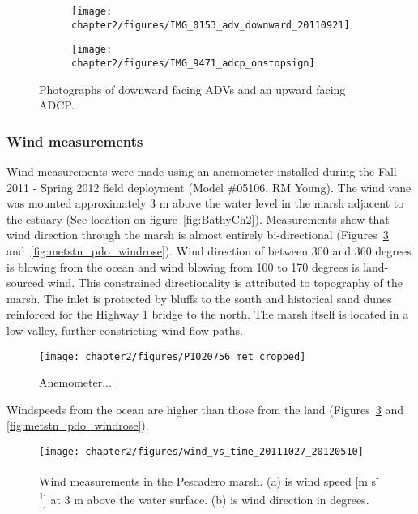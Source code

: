 \begin{figure}[t]
\begin{subfigure}{.5\textwidth}
	\texttt{[image: chapter2/figures/IMG\_0153\_adv\_downward\_20110921]}
\end{subfigure}
\begin{subfigure}{.5\textwidth}
	\texttt{[image: chapter2/figures/IMG\_9471\_adcp\_onstopsign]}
\end{subfigure}
\caption{Photographs of downward facing ADVs and an upward facing ADCP.} \label{fig:ADVADCPphoto}
\end{figure}


\subsubsection{Wind measurements} \label{sssec:windmeas}
Wind measurements were made using an anemometer installed during the Fall 2011 - Spring 2012 field deployment (Model \#05106, RM Young). The wind vane was mounted approximately 3 m above the water level in the marsh adjacent to the estuary (See location on figure~\ref{fig:BathyCh2}).  Measurements show that wind direction through the marsh is almost entirely bi-directional (Figures~\ref{fig:metstn_pdo_ws_wdir} and~\ref{fig:metstn_pdo_windrose}). Wind direction of between 300 and 360 degrees is blowing from the ocean and wind blowing from 100 to 170 degrees is land-sourced wind. This constrained directionality is attributed to topography of the marsh.  The inlet is protected by bluffs to the south and historical sand dunes reinforced for the Highway 1 bridge to the north. The marsh itself is located in a low valley, further constricting wind flow paths. 



\begin{figure} %
	\texttt{[image: chapter2/figures/P1020756\_met\_cropped]} \caption{Anemometer...}
\label{fig:metstnPhoto} 
\end{figure}



Windspeeds from the ocean are higher than those from the land (Figures~\ref{fig:metstn_pdo_ws_wdir} and~
\ref{fig:metstn_pdo_windrose}). 


\begin{figure} %
	\texttt{[image: chapter2/figures/wind\_vs\_time\_20111027\_20120510]} \caption{Wind measurements in the Pescadero marsh. (a) is wind speed [m s\textsuperscript{-1}] at 3 m above the water surface. (b) is wind direction in degrees.}
\label{fig:metstn_pdo_ws_wdir} 
\end{figure}

